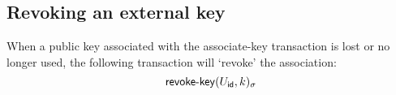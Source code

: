 \subsection{Revoking an external key}
When a public key associated with the \textsf{associate-key} transaction is lost or no
longer used, the following transaction will `revoke' the association:
\[
    \operatorname{\mathsf{revoke-key}}\lparen U_{\mathsf{id}}, k\rparen_\sigma
\]


